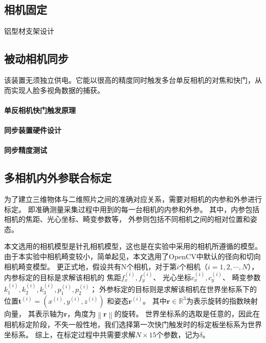 \documentclass{scutmaster}
\begin{document}
\subsection{相机固定}

铝型材支架设计

\subsection{被动相机同步}
\label{sec:passive_sync}

该装置无须独立供电。它能以很高的精度同时触发多台单反相机的对焦和快门，从而实现人脸多视角数据的捕获。

\paragraph{单反相机快门触发原理}

\paragraph{同步装置硬件设计}

\paragraph{同步精度测试}

\subsection{多相机内外参联合标定}

为了建立三维物体与二维照片之间的准确对应关系，需要对相机的内参和外参进行标定。
即准确测量采集过程中用到的每一台相机的内参和外参。
其中，内参包括相机的焦距、光心坐标、畸变参数等，
外参则包括不同相机之间的相对位置和姿态。

本文选用的相机模型是针孔相机模型，这也是在实验中采用的相机所遵循的模型。
由于本实验中相机畸变较小，简单起见，本文选用了OpenCV中默认的径向和切向相机畸变模型\cite{?}。
更正式地，假设共有N个相机，对于第$i$个相机（$i=1,2,\cdots,N$），
内参标定的目标是求解该相机的
焦距$f_x^{(i)},f_y^{(i)}$、
光心坐标$c_x^{(i)},c_y^{(i)}$、
畸变参数$k_1^{(i)},k_2^{(i)},k_3^{(i)},p_1^{(i)},p_2^{(i)}$；
外参标定的目标则是求解该相机在世界坐标系下的
位置$\mathbf{t}^{(i)}=\left(x^{(i)},y^{(i)},z^{(i)}\right)$
和姿态$\mathbf{r}^{(i)}$。
其中$\mathbf{r}\in \mathbb{R}^3$为表示旋转的指数映射向量\cite{?}，
其表示轴为$\mathbf{r}$，角度为$\left\| \mathbf{r}\right\|$的旋转。
世界坐标系的选取是任意的，因此在相机标定阶段，不失一般性地，我们选择第一次快门触发时的标定板坐标系为世界坐标系。
综上，在标定过程中共需要求解$N\times 15$个参数，记为$\delta$。
\end{document}
